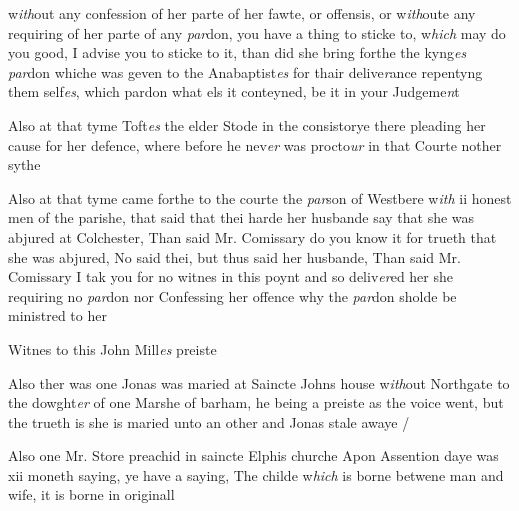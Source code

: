 \documentclass[12pt, a4paper]{book}
\begin{document}
		
		\ifthenelse{\isodd{\thepage}}
		{\reversemarginpar}
		{\normalmarginpar}
		w\textit{ith}out any confession of her parte of her fawte, or
 offensis, or w\textit{ith}oute any requiring of her parte of any
 \textit{par}don, you have a thing to sticke to, w\textit{hich} may do you
 good, I advise you to sticke to it, than did she bring
 forthe the kyng\textit{es}
               \textit{par}don whiche was geven to the
  Anabaptist\textit{es} for thair delive\textit{r}ance repentyng them
 self\textit{es}, which pardon what els it conteyned, be it
 in your Judgeme\textit{n}t
		
		\ifthenelse{\isodd{\thepage}}
		{\reversemarginpar}
		{\normalmarginpar}
		Also at that tyme Toft\textit{es} the elder Stode in the
			consistorye there pleading her cause for her
			defence, where before he nev\textit{er} was procto\textit{ur} in that
			Courte nother sythe
	
 

	
		\ifthenelse{\isodd{\thepage}}
		{\reversemarginpar}
		{\normalmarginpar}
		 Also at that tyme came forthe to the courte the \textit{par}son
 of Westbere w\textit{ith} ii honest men of the parishe, that
 said that thei harde her husbande say that she was
 abjured at Colchester, Than said Mr. Comissary do
 you know it for trueth that she was abjured, No
 said thei, but thus said her husbande, Than said Mr. Comissary I tak you for no witnes in this poynt
 and so deliv\textit{er}ed her she requiring no \textit{par}don nor
 Confessing her offence why the\textit{ par}don sholde be
 ministred to her

	
		
				\marginpar[\vspace{0.5cm}{\textcolor{Gray}{+}}]{}
			
		
		\ifthenelse{\isodd{\thepage}}
		{\reversemarginpar}
		{\normalmarginpar}
		Witnes to this John Mill\textit{es} preiste
	

	
		\ifthenelse{\isodd{\thepage}}
		{\reversemarginpar}
		{\normalmarginpar}
		Also ther was one Jonas was maried at
 Saincte Johns house w\textit{ith}out Northgate to the dowght\textit{er}
 of one Marshe of barham, he being a preiste as the
 voice went, but the trueth is she is maried unto
 an other and Jonas stale awaye /

 
 	
				\marginpar[\vspace{0.5cm}{\textcolor{Gray}{Scory}}]{}
			
 	
		\ifthenelse{\isodd{\thepage}}
		{\reversemarginpar}
		{\normalmarginpar}
		Also one Mr. Store preachid in saincte Elphis
 churche Apon Assention daye was xii moneth
 saying, ye have a saying, The childe w\textit{hich} is borne
 betwene man and wife, it is borne in originall
 
\end{document}
